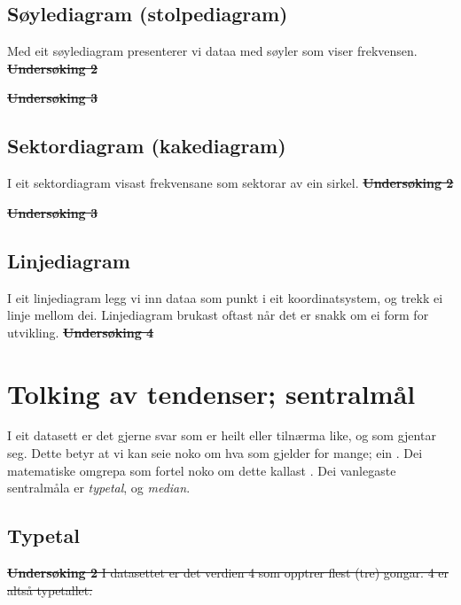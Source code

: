 \newpage
\subsection{Søylediagram (stolpediagram)}
Med eit søylediagram presenterer vi dataa med søyler som viser frekvensen. \\[8pt]
\st{ \label{soylund2}
\textbf{Undersøking 2}
} \vsk

\st{
\textbf{Undersøking 3}
}
\newpage
\subsection{Sektordiagram (kakediagram)}
I eit sektordiagram visast frekvensane som sektorar av ein sirkel. \regv
\st{  \label{sektorund2}
\textbf{Undersøking 2}
} \vsk

\st{ \label{sektorundsk3}
\textbf{Undersøking 3}	
} \vsk

\newpage
\subsection{Linjediagram}
I eit linjediagram legg vi inn dataa som punkt i eit koordinatsystem, og trekk ei linje mellom dei. Linjediagram brukast oftast når det er snakk om ei form for utvikling.\regv
\st{
\textbf{Undersøking 4} \\
}
\section{Tolking av tendenser; sentralmål}
I eit datasett er det gjerne svar som er heilt eller tilnærma like, og som gjentar seg. Dette betyr at vi kan seie noko om hva som gjelder for mange; ein . Dei matematiske omgrepa som fortel noko om dette kallast . Dei vanlegaste sentralmåla er \textit{typetal},  og \textit{median}. \vsk

\newpage
\subsection{Typetal}
 \regv
\st{
\textbf{Undersøking 2} \os
I datasettet er det verdien 4 som opptrer flest (tre) gongar. 4 er altså typetallet.
} 

